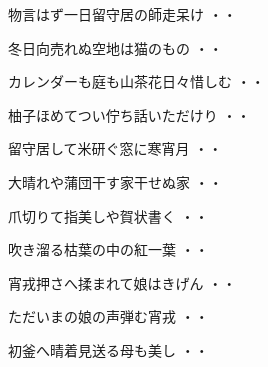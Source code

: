 \begin{shiika}物言はず一日留守居の師走呆け
\hfill{・・}\end{shiika}
\vspace{0.6cm}
\begin{shiika}冬日向売れぬ空地は猫のもの
\hfill{・・}\end{shiika}
\vspace{0.6cm}
\begin{shiika}カレンダーも庭も山茶花日々惜しむ
\hfill{・・}\end{shiika}
\vspace{0.6cm}
\begin{shiika}柚子ほめてつい佇ち話いただけり
\hfill{・・}\end{shiika}
\vspace{0.6cm}
\begin{shiika}留守居して米研ぐ窓に寒宵月
\hfill{・・}\end{shiika}
\vspace{0.6cm}
\begin{shiika}大晴れや蒲団干す家干せぬ家
\hfill{・・}\end{shiika}
\vspace{0.6cm}
\begin{shiika}爪切りて指美しや賀状書く
\hfill{・・}\end{shiika}
\vspace{0.6cm}
\begin{shiika}吹き溜る枯葉の中の紅一葉
\hfill{・・}\end{shiika}
\vspace{0.6cm}
\begin{shiika}宵戎押さへ揉まれて娘はきげん
\hfill{・・}\end{shiika}
\vspace{0.6cm}
\begin{shiika}ただいまの娘の声弾む宵戎
\hfill{・・}\end{shiika}
\vspace{0.6cm}
\begin{shiika}初釜へ晴着見送る母も美し
\hfill{・・}\end{shiika}
\vspace{0.6cm}
